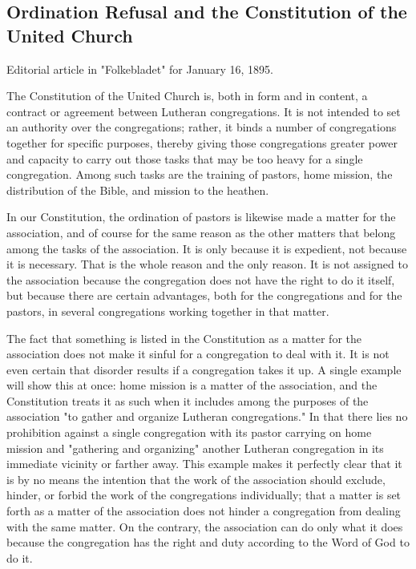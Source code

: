 
\subsection{Ordination Refusal and the Constitution of the United Church}

Editorial article in "Folkebladet" for January 16, 1895.

The Constitution of the United Church is, both in form and in content, a contract or agreement between Lutheran congregations. It is not intended to set an authority over the congregations; rather, it binds a number of congregations together for specific purposes, thereby giving those congregations greater power and capacity to carry out those tasks that may be too heavy for a single congregation. Among such tasks are the training of pastors, home mission, the distribution of the Bible, and mission to the heathen.

In our Constitution, the ordination of pastors is likewise made a matter for the association, and of course for the same reason as the other matters that belong among the tasks of the association. It is only because it is expedient, not because it is necessary. That is the whole reason and the only reason. It is not assigned to the association because the congregation does not have the right to do it itself, but because there are certain advantages, both for the congregations and for the pastors, in several congregations working together in that matter.

The fact that something is listed in the Constitution as a matter for the association does not make it sinful for a congregation to deal with it. It is not even certain that disorder results if a congregation takes it up. A single example will show this at once: home mission is a matter of the association, and the Constitution treats it as such when it includes among the purposes of the association "to gather and organize Lutheran congregations." In that there lies no prohibition against a single congregation with its pastor carrying on home mission and "gathering and organizing" another Lutheran congregation in its immediate vicinity or farther away. This example makes it perfectly clear that it is by no means the intention that the work of the association should exclude, hinder, or forbid the work of the congregations individually; that a matter is set forth as a matter of the association does not hinder a congregation from dealing with the same matter. On the contrary, the association can do only what it does because the congregation has the right and duty according to the Word of God to do it.

